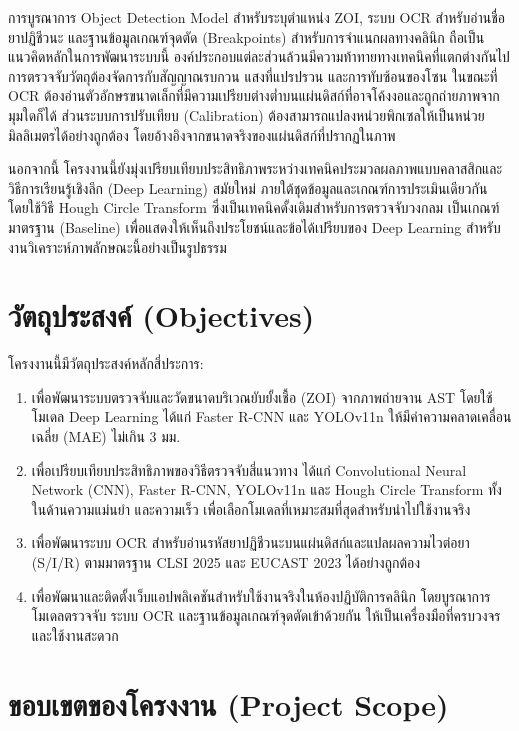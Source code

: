 การบูรณาการ Object Detection Model สำหรับระบุตำแหน่ง ZOI, ระบบ OCR สำหรับอ่านชื่อยาปฏิชีวนะ และฐานข้อมูลเกณฑ์จุดตัด (Breakpoints) สำหรับการจำแนกผลทางคลินิก ถือเป็นแนวคิดหลักในการพัฒนาระบบนี้ องค์ประกอบแต่ละส่วนล้วนมีความท้าทายทางเทคนิคที่แตกต่างกันไป การตรวจจับวัตถุต้องจัดการกับสัญญาณรบกวน แสงที่แปรปรวน และการทับซ้อนของโซน ในขณะที่ OCR ต้องอ่านตัวอักษรขนาดเล็กที่มีความเปรียบต่างต่ำบนแผ่นดิสก์ที่อาจโค้งงอและถูกถ่ายภาพจากมุมใดก็ได้ ส่วนระบบการปรับเทียบ (Calibration) ต้องสามารถแปลงหน่วยพิกเซลให้เป็นหน่วยมิลลิเมตรได้อย่างถูกต้อง โดยอ้างอิงจากขนาดจริงของแผ่นดิสก์ที่ปรากฏในภาพ

นอกจากนี้ โครงงานนี้ยังมุ่งเปรียบเทียบประสิทธิภาพระหว่างเทคนิคประมวลผลภาพแบบคลาสสิกและวิธีการเรียนรู้เชิงลึก (Deep Learning) สมัยใหม่ ภายใต้ชุดข้อมูลและเกณฑ์การประเมินเดียวกัน โดยใช้วิธี Hough Circle Transform ซึ่งเป็นเทคนิคดั้งเดิมสำหรับการตรวจจับวงกลม เป็นเกณฑ์มาตรฐาน (Baseline) เพื่อแสดงให้เห็นถึงประโยชน์และข้อได้เปรียบของ Deep Learning สำหรับงานวิเคราะห์ภาพลักษณะนี้อย่างเป็นรูปธรรม

\section{วัตถุประสงค์ (Objectives)}

โครงงานนี้มีวัตถุประสงค์หลักสี่ประการ:
\begin{enumerate}
  \item เพื่อพัฒนาระบบตรวจจับและวัดขนาดบริเวณยับยั้งเชื้อ (ZOI) จากภาพถ่ายจาน AST โดยใช้โมเดล Deep Learning ได้แก่ Faster R-CNN และ YOLOv11n ให้มีค่าความคลาดเคลื่อนเฉลี่ย (MAE) ไม่เกิน 3 มม.
  \item เพื่อเปรียบเทียบประสิทธิภาพของวิธีตรวจจับสี่แนวทาง ได้แก่ Convolutional Neural Network (CNN), Faster R-CNN, YOLOv11n และ Hough Circle Transform ทั้งในด้านความแม่นยำ และความเร็ว เพื่อเลือกโมเดลที่เหมาะสมที่สุดสำหรับนำไปใช้งานจริง
  \item เพื่อพัฒนาระบบ OCR สำหรับอ่านรหัสยาปฏิชีวนะบนแผ่นดิสก์และแปลผลความไวต่อยา (S/I/R) ตามมาตรฐาน CLSI 2025 และ EUCAST 2023 ได้อย่างถูกต้อง
  \item เพื่อพัฒนาและติดตั้งเว็บแอปพลิเคชันสำหรับใช้งานจริงในห้องปฏิบัติการคลินิก โดยบูรณาการโมเดลตรวจจับ ระบบ OCR และฐานข้อมูลเกณฑ์จุดตัดเข้าด้วยกัน ให้เป็นเครื่องมือที่ครบวงจรและใช้งานสะดวก
\end{enumerate}
\section{ขอบเขตของโครงงาน (Project Scope)}

